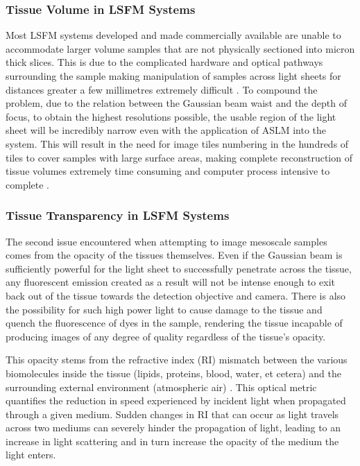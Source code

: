 \subsubsection{Tissue Volume in LSFM Systems}
Most LSFM systems developed and made commercially available are unable to accommodate larger volume samples that are not physically sectioned into micron thick slices. This is due to the complicated hardware and optical pathways surrounding the sample making manipulation of samples across light sheets for distances greater a few millimetres extremely difficult \cite{krzic_multiview_2012, poola_light_2019, gualda_openspinmicroscopy_2013}. To compound the problem, due to the relation between the Gaussian beam waist and the depth of focus, to obtain the highest resolutions possible, the usable region of the light sheet will be incredibly narrow even with the application of ASLM into the system. This will result in the need for image tiles numbering in the hundreds of tiles to cover samples with large surface areas, making complete reconstruction of tissue volumes extremely time consuming and computer process intensive to complete \cite{poola_light_2019}.

\subsubsection{Tissue Transparency in LSFM Systems}
 The second issue encountered when attempting to image mesoscale samples comes from the opacity of the tissues themselves. Even if the Gaussian beam is sufficiently powerful for the light sheet to successfully penetrate across the tissue, any fluorescent emission created as a result will not be intense enough to exit back out of the tissue towards the detection objective and camera. There is also the possibility for such high power light to cause damage to the tissue and quench the fluorescence of dyes in the sample, rendering the tissue incapable of producing images of any degree of quality regardless of the tissue's opacity.

This opacity stems from the refractive index (RI) mismatch between the various biomolecules inside the tissue (lipids, proteins, blood, water, et cetera) and the surrounding external environment (atmospheric air) \cite{paysan_art_2023}. This optical metric quantifies the reduction in speed experienced by incident light when propagated through a given medium. Sudden changes in RI that can occur as light travels across two mediums can severely hinder the propagation of light, leading to an increase in light scattering and in turn increase the opacity of the medium the light enters.

